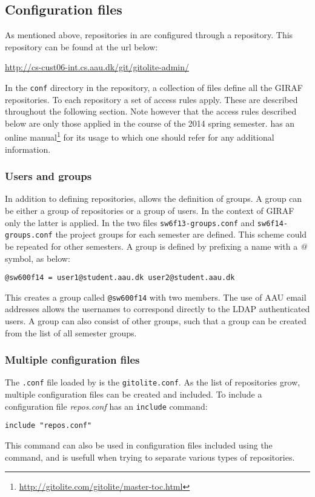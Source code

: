 \subsection{Configuration files}\label{git:gitolite:config}
As mentioned above, repositories in \gitolite{} are configured through a \git{} repository.
This repository can be found at the url below:
\begin{center}
\url{http://cs-cust06-int.cs.aau.dk/git/gitolite-admin/}
\end{center}
In the \texttt{conf} directory in the repository, a collection of files define all the GIRAF repositories.
To each repository a set of access rules apply.
These are described throughout the following section.
Note however that the access rules described below are only those applied in the course of the 2014 spring semester.
\Gitolite{} has an online manual\footnote{\url{http://gitolite.com/gitolite/master-toc.html}} for its usage to which one should refer for any additional information.

\subsubsection{Users and groups}
In addition to defining repositories, \gitolite{} allows the definition of groups.
A group can be either a group of repositories or a group of users.
In the context of GIRAF only the latter is applied.
In the two files \texttt{sw6f13-groups.conf} and \texttt{sw6f14-groups.conf} the project groups for each semester are defined.
This scheme could be repeated for other semesters.
A group is defined by prefixing a name with a \textit{@} symbol, as below:
\begin{center}
\texttt{@sw600f14 = user1@student.aau.dk user2@student.aau.dk}
\end{center}
This creates a group called \texttt{@sw600f14} with two members.
The use of AAU email addresses allows the usernames to correspond directly to the LDAP authenticated users.
A group can also consist of other groups, such that a group can be created from the list of all semester groups.

\subsubsection{Multiple configuration files}
The \texttt{.conf} file loaded by \gitolite{} is the \texttt{gitolite.conf}.
As the list of repositories grow, multiple configuration files can be created and included.
To include a configuration file \textit{repos.conf} \gitolite{} has an \texttt{include} command:
\begin{center}
\texttt{include "repos.conf"}
\end{center}
This command can also be used in configuration files included using the command, and is usefull when trying to separate various types of repositories.

